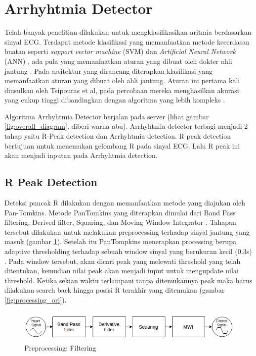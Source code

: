 \documentclass[conference]{IEEEtran}
\begin{document}
\section{Arrhyhtmia Detector}
Telah banyak penelitian dilakukan untuk mengklasifikasikan aritmia berdasarkan sinyal ECG. Terdapat metode klasifikasi yang memanfaatkan metode kecerdasan buatan seperti \textit{support vector machine} (SVM) \cite{aritmia_svm} dan \textit{Artificial Neural Network} (ANN) \cite{aritmia_ann}, ada pula yang memanfaatkan aturan yang dibuat oleh dokter ahli jantung \cite{tsipouras}. Pada arsitektur yang dirancang diterapkan klasifikasi yang memanfaatkan aturan yang dibuat oleh ahli jantung. Aturan ini pertama kali diusulkan oleh Tsipouras et al, pada percobaan mereka menghasilkan akurasi yang cukup tinggi dibandingkan dengan algoritma yang lebih kompleks \cite{tsipouras}.

Algoritma Arrhyhtmia Detector berjalan pada server (lihat gambar \ref{fig:overall_diagram}, diberi warna abu). Arrhyhtmia detector terbagi menjadi 2 tahap yaitu R-Peak detection dan Arrhyhtmia detection. R peak detection bertujuan untuk menemukan gelombang R pada sinyal ECG. Lalu R peak ini akan menjadi inputan pada Arrhyhtmia detection.

\subsection{R Peak Detection}
Deteksi puncak R dilakukan dengan memanfaatkan metode yang diajukan oleh Pan-Tomkins. Metode PanTomkins yang diterapkan dimulai dari Band Pass filtering, Derived filter, Squaring, dan Moving Window Integrator \cite{pantom}. Tahapan tersebut dilakukan untuk melakukan preprocessing terhadap sinyal jantung yang masuk (gambar \ref{fig:preprocessing}). Setelah itu PanTompkins menerapkan processing berupa adaptive thresholding terhadap sebuah window sinyal yang berukuran kecil (0.3s) \cite{pantom}. Pada window tersebut, akan dicari peak yang melewati threshold yang telah ditentukan, kemudian nilai peak akan menjadi input untuk  mengupdate nilai threshold. Ketika sekian waktu terlampaui tanpa ditemukannya peak maka harus dilakukan search back hingga posisi R terakhir yang ditemukan (gambar \ref{fig:processing_ori}).

\begin{figure}[htbp]
\centerline{\includegraphics[scale=0.4]{images/preprocessing.png}}
\caption{Preprocessing: Filtering}
\label{fig:preprocessing}
\end{figure}
\end{document}
